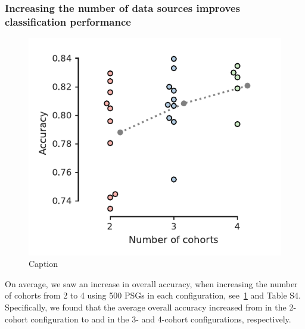 \subsubsection{Increasing the number of data sources improves classification performance}
\begin{figure}
    \centering
    \includegraphics[width=0.75\columnwidth]{figures/paper-ii/figure_05.pdf}
    \caption{Caption}
    \label{fig:paper-ii-figure5}
\end{figure}
On average, we saw an increase in overall accuracy, when increasing the number of cohorts from 2 to 4 using 500 PSGs in each configuration, see~\cref{fig:paper-ii-figure5} and Table S4.
Specifically, we found that the average overall accuracy increased from  in the 2-cohort configuration to  and  in the 3- and 4-cohort configurations, respectively.

